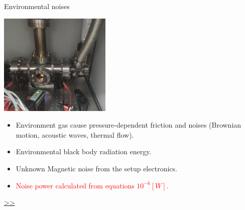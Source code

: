 \documentclass{beamer}
\begin{document}
\begin{frame}{\hypertarget{frame:Environmental noises}{Environmental noises}}
	\begin{center}		
		\includegraphics[width=0.4\textwidth,keepaspectratio]{actual system_crop.jpg}
    \end{center}
	\begin{itemize}
		
		\item Environment gas cause pressure-dependent friction and noises (Brownian motion, acoustic waves, thermal flow).  
		\item Environmental black body radiation energy.
		\item Unknown Magnetic noise from the setup electronics.
		\item \textcolor{red}{Noise power calculated from equations $10^{-6}[W]$.}			

			
	\end{itemize}
	\hyperlink{frame:Environmental noises 1}{>>} 
\end{frame}
\end{document}
